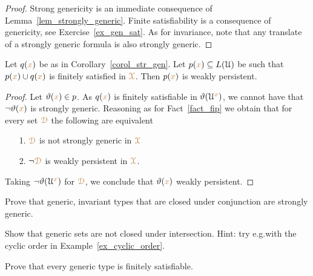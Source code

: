 \begin{proof}
  Strong genericity is an immediate consequence of Lemma~\ref{lem_strongly_generic}.
  Finite satisfiability is a consequence of genericity, see Exercise~\ref{ex_gen_sat}.
  As for invariance, note that any translate of a strongly generic formula is also strongly generic.
\end{proof}

\begin{corollary}\label{corol_q_w_pers}
  Let $q({\color{brown} x})$ be as in Corollary~\ref{corol_str_gen}.
  Let $p({\color{brown} x})\subseteq L(\EuScript U)$ be such that $p({\color{brown} x})\cup q({\color{brown} x})$ is finitely satisfied in ${\color{brown}\EuScript X}$.
  Then $p({\color{brown} x})$ is weakly persistent.
\end{corollary}

\begin{proof}
  Let $\vartheta({\color{brown} x})\in p$.
  As $q({\color{brown} x})$ is finitely satisfiable in $\vartheta(\EuScript U^{\color{brown} x})$, we cannot have that $\neg\vartheta({\color{brown} x})$ is strongly generic.
  Reasoning as for Fact~\ref{fact_fip} we obtain that for every set ${\color{brown}\EuScript D}$ the following are equivalent
  \begin{itemize}
    \item[1.] ${\color{brown}\EuScript D}$ is not strongly generic in ${\color{brown}\EuScript X}$
    \item[2.] $\neg{\color{brown}\EuScript D}$ is weakly persistent in ${\color{brown}\EuScript X}$.
  \end{itemize}
  Taking $\neg\vartheta(\EuScript U^{\color{brown} x})$ for ${\color{brown}\EuScript D}$, we conclude that $\vartheta({\color{brown} x})$ weakly persistent.
\end{proof}

\begin{exercise} 
  Prove that generic, invariant types that are closed under conjunction are strongly generic.
\end{exercise}

\begin{exercise}
  Show that generic sets are not closed under intersection.
  Hint: try e.g.\@ with the cyclic order in Example~\ref{ex_cyclic_order}.
\end{exercise}


\begin{exercise}\label{ex_gen_sat}
  Prove that every generic type is finitely satisfiable.
\end{exercise}

